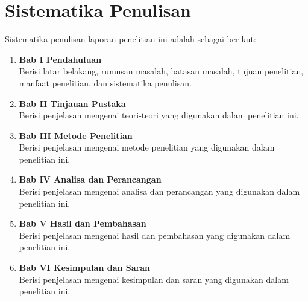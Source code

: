 \section{Sistematika Penulisan}
Sistematika penulisan laporan penelitian ini adalah sebagai berikut:

\begin{enumerate}
    \item \textbf{Bab I Pendahuluan} \\ 
    Berisi latar belakang, rumusan masalah, batasan masalah, tujuan penelitian, manfaat penelitian, dan sistematika penulisan.
    \item \textbf{Bab II Tinjauan Pustaka} \\ 
    Berisi penjelasan mengenai teori-teori yang digunakan dalam penelitian ini.
    \item \textbf{Bab III Metode Penelitian} \\ 
    Berisi penjelasan mengenai metode penelitian yang digunakan dalam penelitian ini.
    \item \textbf{Bab IV Analisa dan Perancangan} \\ 
    Berisi penjelasan mengenai analisa dan perancangan yang digunakan dalam penelitian ini.
    \item \textbf{Bab V Hasil dan Pembahasan} \\ 
    Berisi penjelasan mengenai hasil dan pembahasan yang digunakan dalam penelitian ini.
    \item \textbf{Bab VI Kesimpulan dan Saran} \\ 
    Berisi penjelasan mengenai kesimpulan dan saran yang digunakan dalam penelitian ini.
\end{enumerate}


